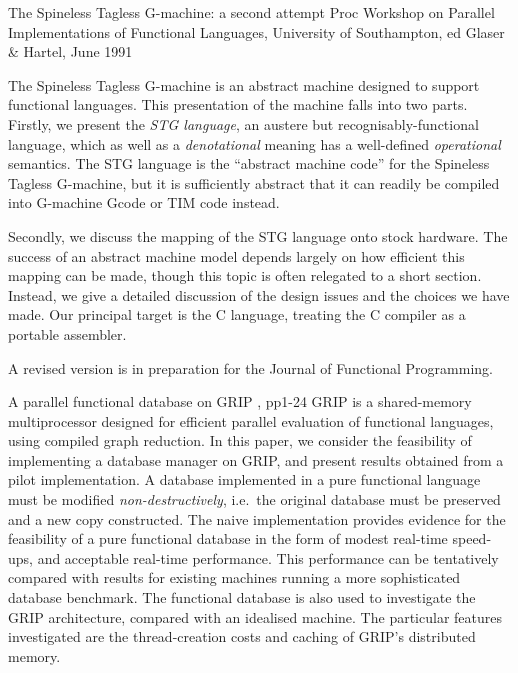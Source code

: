 {The Spineless Tagless G-machine: a second attempt}
{Proc Workshop on Parallel Implementations of Functional Languages,
University of Southampton, ed Glaser \& Hartel, June 1991}
{The Spineless Tagless G-machine is an abstract machine designed
to support functional languages.  This presentation of the machine
falls into two parts.  Firstly, we present the {\em STG language},
an austere but recognisably-functional language, which as well as
a {\em denotational} meaning has a well-defined {\em operational} semantics.
The STG language is the ``abstract machine code'' for the Spineless
Tagless G-machine, but it is sufficiently abstract that it can readily be
compiled into G-machine Gcode or TIM code instead.

Secondly, we discuss the mapping of the STG language onto stock hardware.
The success of an abstract machine model depends largely on how efficient
this mapping can be made, though this topic is often relegated to a short
section.  Instead, we give a detailed discussion of the design issues and
the choices we have made.  Our principal target is the C language, treating
the C compiler as a portable assembler.

A revised version is in preparation for the Journal of Functional Programming.
}

{A parallel functional database on GRIP}
{\GlasgowNinetyOne{}, pp1-24}
{
GRIP is a shared-memory multiprocessor designed for efficient parallel
evaluation of functional languages, using compiled graph reduction.
In this paper, we consider the feasibility of implementing a database
manager on GRIP, and present results obtained from a pilot
implementation.  A database implemented in a pure functional language
must be modified {\em non-destructively}, i.e.\ the original database
must be preserved and a new copy constructed.  The naive
implementation provides evidence for the feasibility of a pure
functional database in the form of modest real-time speed-ups, and
acceptable real-time performance.  This performance can be tentatively
compared with results for existing machines running a more
sophisticated database benchmark.
The functional database is also used to investigate the GRIP
architecture, compared with an idealised machine.  The particular
features investigated are the thread-creation costs and caching of
GRIP's distributed memory.
}


